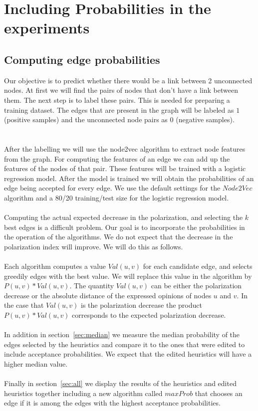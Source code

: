 \chapter{Including Probabilities in the experiments}		
 \label{sec:prob}		

\section{Computing edge probabilities }		
\label{sec:computingEdge}		
\vspace{20pt}
Our objective is to predict whether there would be a link between 2 unconnected nodes. At first we will find the pairs of nodes that don't have a link between them.	
The next step is to label these pairs. This is needed for preparing a training dataset. 
The edges that are present in the graph will be labeled as $1$ (positive samples) and the unconnected node pairs as $0$ (negative samples).		
\\
\\
\\
\noindent After the labelling we will use the node2vec algorithm to extract node features from the graph. For computing the features of an edge we can add up the features of the nodes of that pair. These features will be trained with a logistic regression model. After the model is trained we will obtain the probabilities of an edge being accepted for every edge. We use the default settings for the $Node2Vec$ algorithm and a 80/20 training/test size for the logistic regression model.
\\
\\
\noindent Computing the actual expected decrease in the polarization, and selecting the $k$ best edges is a difficult problem. Our goal is to incorporate the probabilities in the operation of the algorithms. We do not expect that the decrease in the polarization index will improve. We will do this as follows. 
\\
\\
Each algorithm computes a value $Val(u,v)$ for each candidate edge, and selects greedily edges with the best value. We will replace this value in the algorithm by $P(u,v)*Val(u,v)$. The quantity $Val(u,v)$ can be either the polarization decrease or the absolute distance of the expressed opinions of nodes $u$ and $v$. In the case that $Val(u,v)$ is the polarization decrease the product $P(u,v)*Val(u,v)$ corresponds to the expected polarization decrease.
\\
\\
In addition in section~\ref{sec:median} we measure the median probability of the edges selected by the heuristics and compare it to the ones that were edited to include acceptance probabilities. We expect that the edited heuristics will have a higher median value.
\\
\\
Finally in section~\ref{sec:all} we display the results of the heuristics and edited heuristics together including a new algorithm called $maxProb$ that chooses an edge if it is among the edges with the highest acceptance probabilities.

